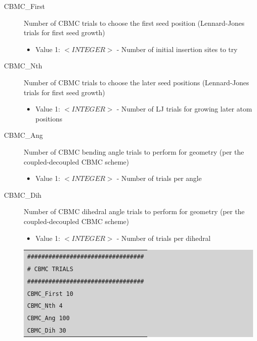 \begin{description}
\item [CBMC\_First] Number of CBMC trials to choose the first seed position (Lennard-Jones trials for first seed growth)
	\begin{itemize}
	\item Value 1: $<INTEGER>$ - Number of initial insertion sites to try
	\end{itemize}
\item [CBMC\_Nth] Number of CBMC trials to choose the later seed positions (Lennard-Jones trials for first seed growth)
	\begin{itemize}
	\item Value 1: $<INTEGER>$ - Number of LJ trials for growing later atom positions
	\end{itemize}
\item [CBMC\_Ang] Number of CBMC bending angle trials to perform for geometry (per the coupled-decoupled CBMC scheme)
	\begin{itemize}
	\item Value 1: $<INTEGER>$ - Number of trials per angle 
	\end{itemize}
\item [CBMC\_Dih] Number of CBMC dihedral angle trials to perform for geometry (per the coupled-decoupled CBMC scheme)
	\begin{itemize}
	\item Value 1: $<INTEGER>$ - Number of trials per dihedral
	\end{itemize}
	\colorbox{lightgray}{
	\begin{tabular}{l}
	\texttt{\#\#\#\#\#\#\#\#\#\#\#\#\#\#\#\#\#\#\#\#\#\#\#\#\#\#\#\#\#\#\#\#\#}\\
	\texttt{\#  CBMC TRIALS}\\
	\texttt{\#\#\#\#\#\#\#\#\#\#\#\#\#\#\#\#\#\#\#\#\#\#\#\#\#\#\#\#\#\#\#\#\#}\\
	\texttt{CBMC\_First   10}\\
	\texttt{CBMC\_Nth     4}\\
	\texttt{CBMC\_Ang     100}\\
	\texttt{CBMC\_Dih     30}\\
	\end{tabular}}
\end{description}
